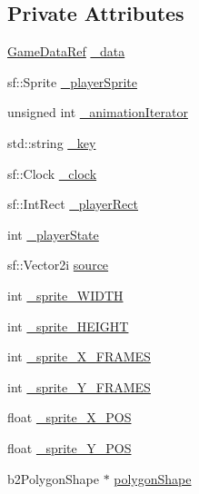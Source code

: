 \subsection*{Private Attributes}
\begin{DoxyCompactItemize}
\item 
\hyperlink{namespaceSekander_a1d69b002ba2d23020901c28f0def5e16}{Game\+Data\+Ref} \hyperlink{classSekander_1_1GameWorld_af884f2489e4a94f95679906932bc0119}{\+\_\+data}
\item 
sf\+::\+Sprite \hyperlink{classSekander_1_1GameWorld_ab15d5f24af33963d1508f31a9b8cb49e}{\+\_\+player\+Sprite}
\item 
unsigned int \hyperlink{classSekander_1_1GameWorld_a5893d4895ff1674d8681216ed8ad7258}{\+\_\+animation\+Iterator}
\item 
std\+::string \hyperlink{classSekander_1_1GameWorld_ace73eff11891a3cbfce71ec1de85f8eb}{\+\_\+key}
\item 
sf\+::\+Clock \hyperlink{classSekander_1_1GameWorld_a825ceb9a0d457b4a8e75d16094ee1c8b}{\+\_\+clock}
\item 
sf\+::\+Int\+Rect \hyperlink{classSekander_1_1GameWorld_abd93d7c6c2b733c5d0a78ea051886fe9}{\+\_\+player\+Rect}
\item 
int \hyperlink{classSekander_1_1GameWorld_a76785ebd5e10d598db14dd1a338172bd}{\+\_\+player\+State}
\item 
sf\+::\+Vector2i \hyperlink{classSekander_1_1GameWorld_a2a23ea4e9dce3bdeee4ce38e2a8a7122}{source}
\item 
int \hyperlink{classSekander_1_1GameWorld_ae71b1a8c967f13881b54f2fee9d3ce3e}{\+\_\+sprite\+\_\+\+W\+I\+D\+TH}
\item 
int \hyperlink{classSekander_1_1GameWorld_af8466397055debb51fbdd1c2808af51f}{\+\_\+sprite\+\_\+\+H\+E\+I\+G\+HT}
\item 
int \hyperlink{classSekander_1_1GameWorld_a7aa72bbfd5f1b4f7ab04c819b815f7be}{\+\_\+sprite\+\_\+\+X\+\_\+\+F\+R\+A\+M\+ES}
\item 
int \hyperlink{classSekander_1_1GameWorld_a55975c2cb042a079708c204ff24695d6}{\+\_\+sprite\+\_\+\+Y\+\_\+\+F\+R\+A\+M\+ES}
\item 
float \hyperlink{classSekander_1_1GameWorld_a3b4e98fc1c72a8d126f58fc1d65267bf}{\+\_\+sprite\+\_\+\+X\+\_\+\+P\+OS}
\item 
float \hyperlink{classSekander_1_1GameWorld_ac9cee04f7adc8cca928b1fb166c2bac5}{\+\_\+sprite\+\_\+\+Y\+\_\+\+P\+OS}
\item 
b2\+Polygon\+Shape $\ast$ \hyperlink{classSekander_1_1GameWorld_a0797c51490bfc5a53b8effac8f195a65}{polygon\+Shape}

\end{DoxyCompactItemize}

